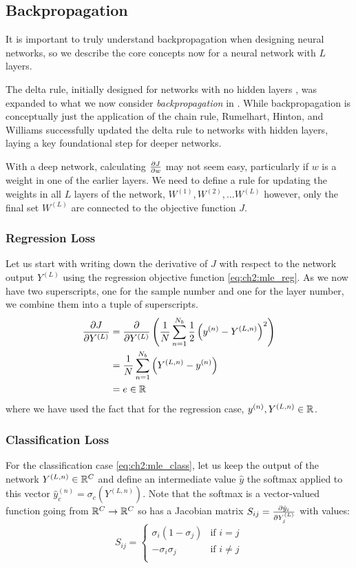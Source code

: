 \subsection{Backpropagation}
It is important to truly understand backpropagation when designing neural
networks, so we describe the core concepts now for a neural network with
$L$ layers.

The delta rule, initially designed for networks with no hidden layers 
\cite{widrow_neurocomputing:_1988}, was expanded to what we now consider
\emph{backpropagation} in \cite{rumelhart_parallel_1986}. While backpropagation
is conceptually just the application of the chain rule, Rumelhart, Hinton, and
Williams successfully updated the delta rule to networks with hidden layers,
laying a key foundational step for deeper networks. 

With a deep network, calculating $\dydx{J}{w}$ may not seem easy,
particularly if $w$ is a weight in one of the earlier layers. We need
to define a rule for updating the weights in all $L$ layers of the network,
$W^{(1)}, W^{(2)}, \ldots W^{(L)}$ however, only the final set $W^{(L)}$ are
connected to the objective function $J$. 

\subsubsection{Regression Loss}
Let us start with writing down the derivative of $J$ with respect to the network
output $Y^{(L)}$ using the regression objective function \eqref{eq:ch2:mle_reg}. 
As we now have two superscripts,
one for the sample number and one for the layer number, we combine them into a
tuple of superscripts. 
\begin{align}
  \dydx{J}{Y^{(L)}} &= \dydx{}{Y^{(L)}} \left( \frac{1}{N}\sum_{n=1}^{N_b}\frac{1}{2} \left(y^{(n)} - Y^{(L, n)}\right)^2\right) \\
                    &= \frac{1}{N}\sum_{n=1}^{N_b} \left(Y^{(L, n)} - y^{(n)} \right) \\
                    &= e \in \reals \label{eq:ch2:reg_b1}
\end{align}
where we have used the fact that for the regression case, $y^{(n)}, Y^{(L,n)}
\in \reals$. 

\subsubsection{Classification Loss}
For the classification case \eqref{eq:ch2:mle_class}, let us keep the output of
the network $Y^{(L,n)} \in \reals[C]$ and define an intermediate value $\hat{y}$ the
softmax applied to this vector $\hat{y}^{(n)}_c = \sigma_c\left(Y^{(L, n)}\right)$.
Note that the softmax is a vector-valued function going from $\reals[C] \rightarrow
\reals[C]$ so has a Jacobian matrix $S_{ij} = \dydx{\hat{y}_i}{Y^{(L)}_j}$ with
values:
\begin{equation}
  S_{ij} = \begin{cases}
    \sigma_i (1-\sigma_j) & \text{if $i=j$}\\
    -\sigma_i \sigma_j & \text{if $i\neq j$}\\
  \end{cases}
\end{equation}

